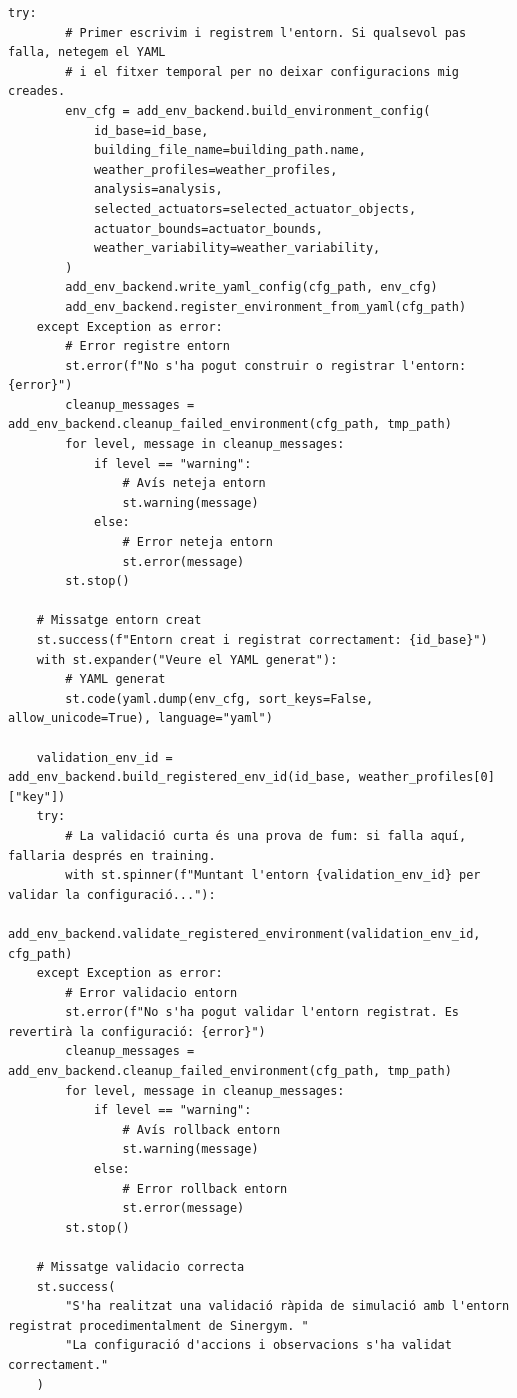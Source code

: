 \documentclass[10pt,a4paper]{article}
\begin{document}
\begin{lstlisting}[style=studioPython,caption={pages/Afegir\_Entorn.py},label={lst:pages-afegir-entorn-py}]
    try:
        # Primer escrivim i registrem l'entorn. Si qualsevol pas falla, netegem el YAML
        # i el fitxer temporal per no deixar configuracions mig creades.
        env_cfg = add_env_backend.build_environment_config(
            id_base=id_base,
            building_file_name=building_path.name,
            weather_profiles=weather_profiles,
            analysis=analysis,
            selected_actuators=selected_actuator_objects,
            actuator_bounds=actuator_bounds,
            weather_variability=weather_variability,
        )
        add_env_backend.write_yaml_config(cfg_path, env_cfg)
        add_env_backend.register_environment_from_yaml(cfg_path)
    except Exception as error:
        # Error registre entorn
        st.error(f"No s'ha pogut construir o registrar l'entorn: {error}")
        cleanup_messages = add_env_backend.cleanup_failed_environment(cfg_path, tmp_path)
        for level, message in cleanup_messages:
            if level == "warning":
                # Avís neteja entorn
                st.warning(message)
            else:
                # Error neteja entorn
                st.error(message)
        st.stop()

    # Missatge entorn creat
    st.success(f"Entorn creat i registrat correctament: {id_base}")
    with st.expander("Veure el YAML generat"):
        # YAML generat
        st.code(yaml.dump(env_cfg, sort_keys=False, allow_unicode=True), language="yaml")

    validation_env_id = add_env_backend.build_registered_env_id(id_base, weather_profiles[0]["key"])
    try:
        # La validació curta és una prova de fum: si falla aquí, fallaria després en training.
        with st.spinner(f"Muntant l'entorn {validation_env_id} per validar la configuració..."):
            add_env_backend.validate_registered_environment(validation_env_id, cfg_path)
    except Exception as error:
        # Error validacio entorn
        st.error(f"No s'ha pogut validar l'entorn registrat. Es revertirà la configuració: {error}")
        cleanup_messages = add_env_backend.cleanup_failed_environment(cfg_path, tmp_path)
        for level, message in cleanup_messages:
            if level == "warning":
                # Avís rollback entorn
                st.warning(message)
            else:
                # Error rollback entorn
                st.error(message)
        st.stop()

    # Missatge validacio correcta
    st.success(
        "S'ha realitzat una validació ràpida de simulació amb l'entorn registrat procedimentalment de Sinergym. "
        "La configuració d'accions i observacions s'ha validat correctament."
    )



\end{lstlisting}
\end{document}
